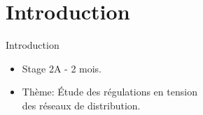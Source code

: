 \section{Introduction}
\begin{frame}{Introduction}
\begin{itemize}
	\item Stage 2A - 2 mois.
	\item Thème: Étude des régulations en tension \\ \qquad \qquad des réseaux de distribution.
\end{itemize}

\end{frame}

